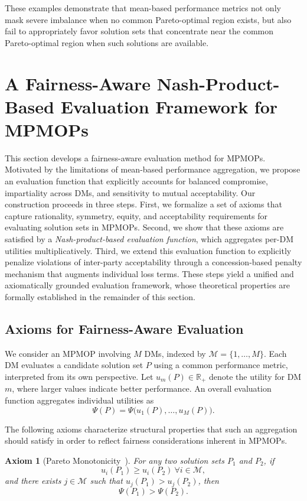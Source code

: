 \documentclass[journal]{IEEEtran}
\newtheorem{axiom}{Axiom}
\begin{document}
These examples demonstrate that mean-based performance metrics not only mask severe imbalance when no common Pareto-optimal region exists, but also fail to appropriately favor solution sets that concentrate near the common Pareto-optimal region when such solutions are available.

\section{A Fairness-Aware Nash-Product-Based Evaluation Framework for MPMOPs}
\label{sec:proposed}
This section develops a fairness-aware evaluation method for MPMOPs. Motivated by the limitations of mean-based performance aggregation, we propose an evaluation function that explicitly accounts for balanced compromise, impartiality across DMs, and sensitivity to mutual acceptability. Our construction proceeds in three steps. First, we formalize a set of axioms that capture rationality, symmetry, equity, and acceptability requirements for evaluating solution sets in MPMOPs. Second, we show that these axioms are satisfied by a \emph{Nash-product-based evaluation function}, which aggregates per-DM utilities multiplicatively. Third, we extend this evaluation function to explicitly penalize violations of inter-party acceptability through a concession-based penalty mechanism that augments individual loss terms. These steps yield a unified and axiomatically grounded evaluation framework, whose theoretical properties are formally established in the remainder of this section.

\subsection{Axioms for Fairness-Aware Evaluation}
\label{sec:axioms}

We consider an MPMOP involving $M$ DMs, indexed by $\mathcal{M}=\{1,\dots,M\}$. Each DM evaluates a candidate solution set $P$ using a common performance metric, interpreted from its own perspective. Let $u_m(P)\in\mathbb{R}_{+}$ denote the utility for DM $m$, where larger values indicate better performance. An overall evaluation function aggregates individual utilities as
\[
\Psi(P) = \Psi\big(u_1(P),\dots,u_M(P)\big).
\]

The following axioms characterize structural properties that such an aggregation should satisfy in order to reflect fairness considerations inherent in MPMOPs.

\begin{axiom}[Pareto Monotonicity~\cite{nash1950bargaining}]
	\label{ax:pareto}
	For any two solution sets $P_1$ and $P_2$, if 
	\[
	u_i(P_1) \ge u_i(P_2) \ \forall i \in \mathcal{M}, 
	\]
	and there exists $j \in \mathcal{M}$ such that $u_j(P_1) > u_j(P_2)$, then
	\[
	\Psi(P_1) > \Psi(P_2).
	\]
\end{axiom}
\end{document}
